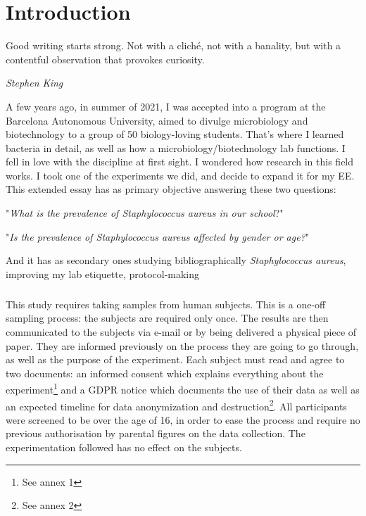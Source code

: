 \chapter{Introduction}
\epigraph{Good writing starts strong. Not with a cliché, not with a banality, but with a contentful observation that provokes curiosity.}{\textit{Stephen King}}
A few years ago, in summer of 2021, I was accepted into a program at the Barcelona Autonomous University, aimed to divulge microbiology and biotechnology to a group of 50 biology-loving students. That's where I learned bacteria in detail, as well as how a microbiology/biotechnology lab functions. I fell in love with the discipline at first sight. I wondered how research in this field works. I took one of the experiments we did, and decide to expand it for my EE.%
This extended essay has as primary objective answering these two questions:
\begin{center}"\emph{What is the prevalence of \emph{Staphylococcus aureus} in our school}?"\end{center}
\begin{center}"\emph{Is the prevalence of \emph{Staphylococcus aureus} affected by gender or age?}"\end{center}
And it has as secondary ones studying bibliographically \emph{Staphylococcus aureus}, improving my lab etiquette, protocol-making
\paragraph{}This study requires taking samples from  human subjects. This is a one-off sampling process: the subjects are required only once. The results are then communicated to the subjects via e-mail or by being delivered a physical piece of paper. They are informed previously on the process they are going to go through, as well as the purpose of the experiment. Each subject must read and agree to two documents: an informed consent which explains everything about the experiment\footnote{See annex 1} and a GDPR notice which documents the use of their data as well as an expected timeline for data anonymization and destruction\footnote{See annex 2}. All participants were screened to be over the age of 16, in order to ease the process and require no previous authorisation by parental figures on the data collection. The experimentation followed has no effect on the subjects\cite{WhatGDPREU2018}.
